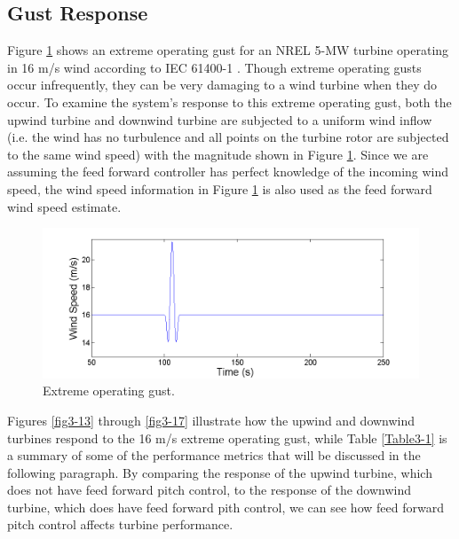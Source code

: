 \subsection{Gust Response}\label{section3-4-1}

Figure \ref{fig3-12} shows an extreme operating gust for an NREL 5-MW turbine operating in 16 m/s wind according to IEC 61400-1 \cite{IEC2005}. Though extreme operating gusts occur infrequently, they can be very damaging to a wind turbine when they do occur. To examine the system's response to this extreme operating gust, both the upwind turbine and downwind turbine are subjected to a uniform wind inflow (i.e. the wind has no turbulence and all points on the turbine rotor are subjected to the same wind speed) with the magnitude shown in Figure \ref{fig3-12}. Since we are assuming the feed forward controller has perfect knowledge of the incoming wind speed, the wind speed information in Figure \ref{fig3-12} is also used as the feed forward wind speed estimate.


\begin{figure}[htbp]
	\centering
		\includegraphics[width = \linewidth]{Figures/ch3Figures/fig3-12.png}
		
	\caption{Extreme operating gust.}
	\label{fig3-12}
\end{figure}


Figures \ref{fig3-13} through \ref{fig3-17} illustrate how the upwind and downwind turbines respond to the 16 m/s extreme operating gust, while Table \ref{Table3-1} is a summary of some of the performance metrics that will be discussed in the following paragraph. By comparing the response of the upwind turbine, which does not have feed forward pitch control, to the response of the downwind turbine, which does have feed forward pith control, we can see how feed forward pitch control affects turbine performance.

